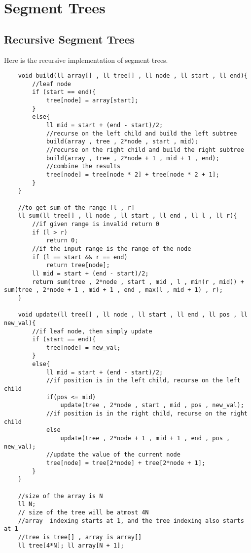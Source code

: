 \documentclass[12pt,a4paper]{amsart}
\numberwithin{equation}{section}
\theoremstyle{definition}
\begin{document}
\section{Segment Trees}

\subsection{Recursive Segment Trees} Here is the recursive implementation of segment trees. 

\begin{lstlisting}
    void build(ll array[] , ll tree[] , ll node , ll start , ll end){
        //leaf node
        if (start == end){
            tree[node] = array[start];
        }
        else{
            ll mid = start + (end - start)/2;
            //recurse on the left child and build the left subtree
            build(array , tree , 2*node , start , mid);
            //recurse on the right child and build the right subtree
            build(array , tree , 2*node + 1 , mid + 1 , end);
            //combine the results
            tree[node] = tree[node * 2] + tree[node * 2 + 1];
        }
    }
    
    //to get sum of the range [l , r]
    ll sum(ll tree[] , ll node , ll start , ll end , ll l , ll r){
        //if given range is invalid return 0
        if (l > r)
            return 0;
        //if the input range is the range of the node
        if (l == start && r == end)
            return tree[node];
        ll mid = start + (end - start)/2;
        return sum(tree , 2*node , start , mid , l , min(r , mid)) + sum(tree , 2*node + 1 , mid + 1 , end , max(l , mid + 1) , r);
    }

    void update(ll tree[] , ll node , ll start , ll end , ll pos , ll new_val){
        //if leaf node, then simply update
        if (start == end){
            tree[node] = new_val;
        }
        else{
            ll mid = start + (end - start)/2;
            //if position is in the left child, recurse on the left child
            if(pos <= mid)
                update(tree , 2*node , start , mid , pos , new_val);
            //if position is in the right child, recurse on the right child
            else
                update(tree , 2*node + 1 , mid + 1 , end , pos , new_val);
            //update the value of the current node
            tree[node] = tree[2*node] + tree[2*node + 1];
        }
    }
    
    //size of the array is N
    ll N; 
    // size of the tree will be atmost 4N
    //array  indexing starts at 1, and the tree indexing also starts at 1
    //tree is tree[] , array is array[]
    ll tree[4*N]; ll array[N + 1];
    

\end{lstlisting}
\end{document}
